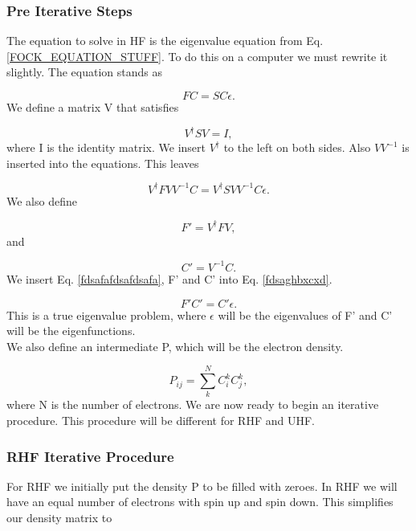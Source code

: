 \documentclass[a4paper,norsk,11pt,twoside]{report}
\begin{document}
\subsubsection{Pre Iterative Steps}
The equation to solve in HF is the eigenvalue equation from Eq. \eqref{FOCK_EQUATION_STUFF}. To do this on a computer we must rewrite it slightly. The equation stands as

\begin{equation}
F C = S C \epsilon . \label{fdsaghbxcxd}
\end{equation}
We define a matrix V that satisfies

\begin{equation}
V^{\dag} S V = I , \label{fdsafafdsafdsafa}
\end{equation}
where I is the identity matrix. We insert $V^{\dag}$ to the left on both sides. Also $V V^{-1} $ is inserted into the equations. This leaves

\begin{equation}
V^{\dag} F V V^{-1} C = V^{\dag} S V V^{-1} C \epsilon .
\end{equation}
We also define 

\begin{equation}
F' = V^{\dag} F V ,
\end{equation}
and

\begin{equation}
C' = V^{-1} C .
\end{equation} 
We insert Eq. \eqref{fdsafafdsafdsafa}, F' and C' into Eq. \eqref{fdsaghbxcxd}.

\begin{equation}
F' C' = C' \epsilon .
\end{equation}
This is a true eigenvalue problem, where $\epsilon$ will be the eigenvalues of F' and C' will be the eigenfunctions. \\

We also define an intermediate P, which will be the electron density. 

\begin{equation}
P_{ij} = \sum_k^N C_i^k C_j^k ,
\end{equation}
where N is the number of electrons. We are now ready to begin an iterative procedure. This procedure will be different for RHF and UHF. 

\subsubsection{RHF Iterative Procedure}
For RHF we initially put the density P to be filled with zeroes. In RHF we will have an equal number of electrons with spin up and spin down. This simplifies our density matrix to
\end{document}
